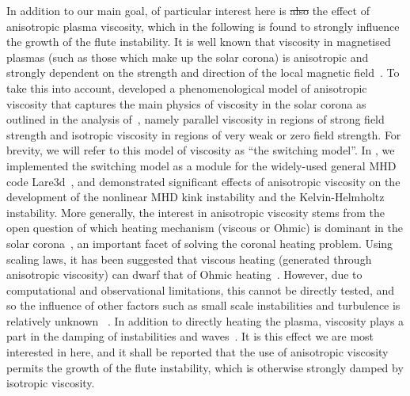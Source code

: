 \documentclass[fleqn,usenatbib]{mnras}
\newcommand{\rev}[1]{{\color{red} {#1}}}
\newcommand{\revcite}[1]{{\color{red} \underline{#1}}}
\begin{document}
In addition to our main goal, of particular interest here is
\rev{\sout{also}} the effect of
anisotropic plasma viscosity, which in the following is found to strongly
influence the growth of the flute instability. It is well known that viscosity
in magnetised plasmas (such as those which make up the solar corona) is
anisotropic and strongly dependent on the strength and direction of the local
magnetic
field~\citep{hollwegViscosityChewGoldbergerLowEquations1986,hollwegViscosityMagnetizedPlasma1985,braginskiiTransportProcessesPlasma1965}.
To take this into account,
\revcite{\citet{mactaggartBraginskiiMagnetohydrodynamicsArbitrary2017}}
developed a phenomenological model of anisotropic  viscosity
that captures the main physics of viscosity in the solar corona as outlined in the
analysis of~\cite{braginskiiTransportProcessesPlasma1965}, namely parallel
viscosity in regions of strong field  strength and isotropic viscosity in
regions of very weak or zero field strength. For brevity, we will refer to this
model of viscosity as ``the switching model''.
In \revcite{\citet{quinnEffectAnisotropicViscosity2020,quinnKelvinHelmholtzInstabilityCollapse2021}}, 
we implemented the switching model as a module for the widely-used general MHD
code Lare3d~\citep{arberStaggeredGridLagrangian2001}, and demonstrated
significant effects of anisotropic viscosity on the development of the
nonlinear MHD kink instability and the Kelvin-Helmholtz instability. More
generally, the interest in anisotropic viscosity stems from the open question
of which heating mechanism (viscous or Ohmic) is dominant in the solar
corona~\citep{klimchukSolvingCoronalHeating2006}, an important facet of solving
the coronal heating problem. Using scaling laws, it has been suggested that
viscous heating (generated through anisotropic viscosity) can dwarf that of
Ohmic
heating~\citep{craigAnisotropicViscousDissipation2009a,litvinenkoViscousEnergyDissipation2005}.
However, due to computational and observational limitations, this cannot be
directly tested, and so the influence of other factors such as small scale
instabilities and turbulence is relatively
unknown~\revcite{\citep{klimchukSolvingCoronalHeating2006}}. In addition to directly
heating the plasma, viscosity plays a part in the damping of instabilities and
waves~\citep{rudermanSlowSurfaceWave2000}. It is this effect we are most
interested in here, and it shall be reported that the use of anisotropic
viscosity permits the \rev{growth} of the flute instability, which is otherwise
strongly damped by isotropic viscosity.
\end{document}
